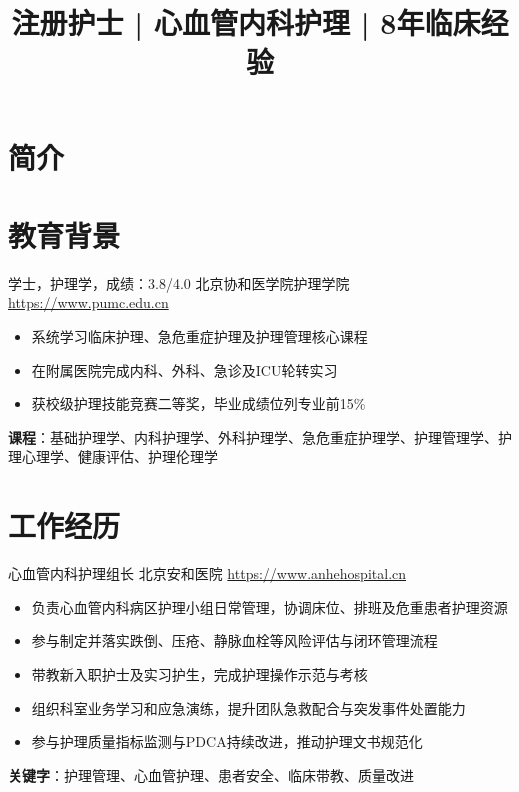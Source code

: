 \documentclass[a4paper, serif, 10pt]{moderncv}
\title{注册护士 | 心血管内科护理 | 8年临床经验}
\begin{document}
\maketitle

\section{简介}

\section{教育背景}

        {学士，护理学，成绩：3.8/4.0}
        {北京协和医学院护理学院}
        {\url{https://www.pumc.edu.cn}}
        {}
        {\begin{itemize}
\item 系统学习临床护理、急危重症护理及护理管理核心课程
\item 在附属医院完成内科、外科、急诊及ICU轮转实习
\item 获校级护理技能竞赛二等奖，毕业成绩位列专业前15\%
\end{itemize}
\textbf{课程}：基础护理学、内科护理学、外科护理学、急危重症护理学、护理管理学、护理心理学、健康评估、护理伦理学}
\section{工作经历}

        {心血管内科护理组长}
        {北京安和医院}
        {\url{https://www.anhehospital.cn}}
        {}
        {\begin{itemize}
\item 负责心血管内科病区护理小组日常管理，协调床位、排班及危重患者护理资源
\item 参与制定并落实跌倒、压疮、静脉血栓等风险评估与闭环管理流程
\item 带教新入职护士及实习护生，完成护理操作示范与考核
\item 组织科室业务学习和应急演练，提升团队急救配合与突发事件处置能力
\item 参与护理质量指标监测与PDCA持续改进，推动护理文书规范化
\end{itemize}
\textbf{关键字}：护理管理、心血管护理、患者安全、临床带教、质量改进}
\end{document}
